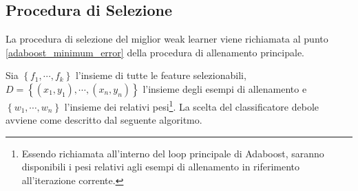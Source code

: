         \subsection{Procedura di Selezione} %
        \label{sub:weak_learner_selection_procedure}
            La procedura di selezione del miglior weak learner viene richiamata al punto \ref{adaboost_minimum_error} della procedura di allenamento principale.

            Sia $\left\{f_1,\cdots,f_k\right\}$ l'insieme di tutte le feature selezionabili, $D = \left\{(x_1,y_1), \cdots, (x_n, y_n) \right\}$ l'insieme degli esempi di allenamento e $\left\{w_1, \cdots, w_n\right\}$ l'insieme dei relativi pesi\footnote{Essendo richiamata all'interno del loop principale di Adaboost, saranno disponibili i pesi relativi agli esempi di allenamento in riferimento all'iterazione corrente.}. 
            La scelta del classificatore debole avviene come descritto dal seguente algoritmo.

